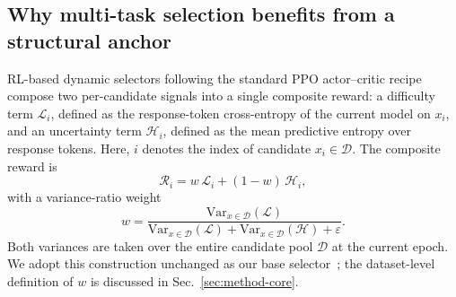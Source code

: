  \subsection{Why multi-task selection benefits from a structural anchor}
\label{sec:method-motivation}

RL-based dynamic selectors following the standard PPO actor--critic
recipe~\cite{schulman2017ppo, schulman2016gae} compose two
per-candidate signals into a single composite reward: a difficulty
term $\mathcal{L}_i$, defined as the response-token cross-entropy of
the current model on $x_i$, and an uncertainty term $\mathcal{H}_i$,
defined as the mean predictive entropy over response tokens. Here,
$i$ denotes the index of candidate $x_i \in \mathcal{D}$. The
composite reward is
\begin{equation}
  \mathcal{R}_i
  =
  w\,\mathcal{L}_i + (1-w)\,\mathcal{H}_i,
  \label{eq:composite}
\end{equation}
with a variance-ratio weight
\begin{equation}
  w
  =
  \frac{\mathrm{Var}_{x \in \mathcal{D}}(\mathcal{L})}
       {\mathrm{Var}_{x \in \mathcal{D}}(\mathcal{L})
        +
        \mathrm{Var}_{x \in \mathcal{D}}(\mathcal{H})
        +
        \varepsilon}.
  \label{eq:w}
\end{equation}
Both variances are taken over the entire candidate pool
$\mathcal{D}$ at the current epoch. We adopt this construction
unchanged as our base selector~\cite{sun2025dots, kung2023activeit};
the dataset-level definition of $w$ is discussed in
Sec.~\ref{sec:method-core}.
